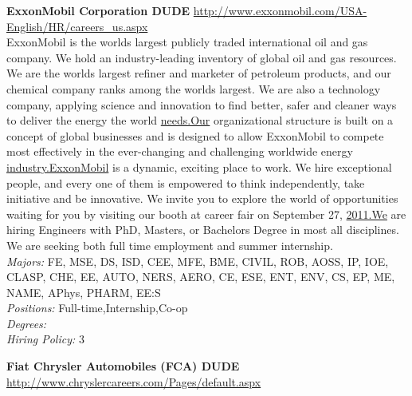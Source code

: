 \documentclass[twoside]{article}
\begin{document}
\begin{center}
\begin{multicols}{2}
\begin{minipage}{.95\columnwidth}{\Large\bf ExxonMobil Corporation \hfill DUDE}
    \url{http://www.exxonmobil.com/USA-English/HR/careers_us.aspx}\\
    ExxonMobil is the worlds largest publicly traded international oil and gas company. We hold an industry-leading inventory of global oil and gas resources. We are the worlds largest refiner and marketer of petroleum products, and our chemical company ranks among the worlds largest. We are also a technology company, applying science and innovation to find better, safer and cleaner ways to deliver the energy the world \url{needs.Our} organizational structure is built on a concept of global businesses and is designed to allow ExxonMobil to compete most effectively in the ever-changing and challenging worldwide energy \url{industry.ExxonMobil} is a dynamic, exciting place to work. We hire exceptional people, and every one of them is empowered to think independently, take initiative and be innovative. We invite you to explore the world of opportunities waiting for you by visiting our booth at career fair on September 27, \url{2011.We} are hiring Engineers with PhD, Masters, or Bachelors Degree in most all disciplines. We are seeking both full time employment and summer internship.\\
    \emph{Majors:} FE, MSE, DS, ISD, CEE, MFE, BME, CIVIL, ROB, AOSS, IP, IOE, CLASP, CHE, EE, AUTO, NERS, AERO, CE, ESE, ENT, ENV, CS, EP, ME, NAME, APhys, PHARM, EE:S\\
    \emph{Positions:} Full-time,Internship,Co-op\\
    \emph{Degrees:} \\
    \emph{Hiring Policy:} 3\\
\end{minipage}
 \begin{minipage}{.95\columnwidth}{\Large\bf Fiat Chrysler Automobiles (FCA) \hfill DUDE}\\
    \url{http://www.chryslercareers.com/Pages/default.aspx}\\

\end{minipage}
\end{multicols}
\end{center}
\end{document}
